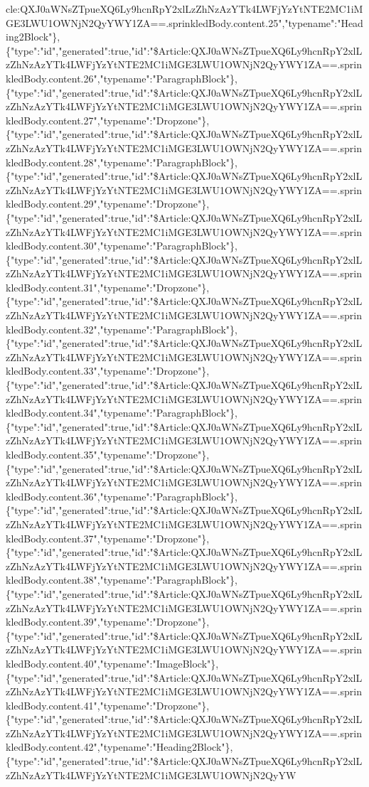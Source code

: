 cle:QXJ0aWNsZTpueXQ6Ly9hcnRpY2xlLzZhNzAzYTk4LWFjYzYtNTE2MC1iMGE3LWU1OWNjN2QyYWY1ZA==.sprinkledBody.content.25","typename":"Heading2Block"\},\{"type":"id","generated":true,"id":"\$Article:QXJ0aWNsZTpueXQ6Ly9hcnRpY2xlLzZhNzAzYTk4LWFjYzYtNTE2MC1iMGE3LWU1OWNjN2QyYWY1ZA==.sprinkledBody.content.26","typename":"ParagraphBlock"\},\{"type":"id","generated":true,"id":"\$Article:QXJ0aWNsZTpueXQ6Ly9hcnRpY2xlLzZhNzAzYTk4LWFjYzYtNTE2MC1iMGE3LWU1OWNjN2QyYWY1ZA==.sprinkledBody.content.27","typename":"Dropzone"\},\{"type":"id","generated":true,"id":"\$Article:QXJ0aWNsZTpueXQ6Ly9hcnRpY2xlLzZhNzAzYTk4LWFjYzYtNTE2MC1iMGE3LWU1OWNjN2QyYWY1ZA==.sprinkledBody.content.28","typename":"ParagraphBlock"\},\{"type":"id","generated":true,"id":"\$Article:QXJ0aWNsZTpueXQ6Ly9hcnRpY2xlLzZhNzAzYTk4LWFjYzYtNTE2MC1iMGE3LWU1OWNjN2QyYWY1ZA==.sprinkledBody.content.29","typename":"Dropzone"\},\{"type":"id","generated":true,"id":"\$Article:QXJ0aWNsZTpueXQ6Ly9hcnRpY2xlLzZhNzAzYTk4LWFjYzYtNTE2MC1iMGE3LWU1OWNjN2QyYWY1ZA==.sprinkledBody.content.30","typename":"ParagraphBlock"\},\{"type":"id","generated":true,"id":"\$Article:QXJ0aWNsZTpueXQ6Ly9hcnRpY2xlLzZhNzAzYTk4LWFjYzYtNTE2MC1iMGE3LWU1OWNjN2QyYWY1ZA==.sprinkledBody.content.31","typename":"Dropzone"\},\{"type":"id","generated":true,"id":"\$Article:QXJ0aWNsZTpueXQ6Ly9hcnRpY2xlLzZhNzAzYTk4LWFjYzYtNTE2MC1iMGE3LWU1OWNjN2QyYWY1ZA==.sprinkledBody.content.32","typename":"ParagraphBlock"\},\{"type":"id","generated":true,"id":"\$Article:QXJ0aWNsZTpueXQ6Ly9hcnRpY2xlLzZhNzAzYTk4LWFjYzYtNTE2MC1iMGE3LWU1OWNjN2QyYWY1ZA==.sprinkledBody.content.33","typename":"Dropzone"\},\{"type":"id","generated":true,"id":"\$Article:QXJ0aWNsZTpueXQ6Ly9hcnRpY2xlLzZhNzAzYTk4LWFjYzYtNTE2MC1iMGE3LWU1OWNjN2QyYWY1ZA==.sprinkledBody.content.34","typename":"ParagraphBlock"\},\{"type":"id","generated":true,"id":"\$Article:QXJ0aWNsZTpueXQ6Ly9hcnRpY2xlLzZhNzAzYTk4LWFjYzYtNTE2MC1iMGE3LWU1OWNjN2QyYWY1ZA==.sprinkledBody.content.35","typename":"Dropzone"\},\{"type":"id","generated":true,"id":"\$Article:QXJ0aWNsZTpueXQ6Ly9hcnRpY2xlLzZhNzAzYTk4LWFjYzYtNTE2MC1iMGE3LWU1OWNjN2QyYWY1ZA==.sprinkledBody.content.36","typename":"ParagraphBlock"\},\{"type":"id","generated":true,"id":"\$Article:QXJ0aWNsZTpueXQ6Ly9hcnRpY2xlLzZhNzAzYTk4LWFjYzYtNTE2MC1iMGE3LWU1OWNjN2QyYWY1ZA==.sprinkledBody.content.37","typename":"Dropzone"\},\{"type":"id","generated":true,"id":"\$Article:QXJ0aWNsZTpueXQ6Ly9hcnRpY2xlLzZhNzAzYTk4LWFjYzYtNTE2MC1iMGE3LWU1OWNjN2QyYWY1ZA==.sprinkledBody.content.38","typename":"ParagraphBlock"\},\{"type":"id","generated":true,"id":"\$Article:QXJ0aWNsZTpueXQ6Ly9hcnRpY2xlLzZhNzAzYTk4LWFjYzYtNTE2MC1iMGE3LWU1OWNjN2QyYWY1ZA==.sprinkledBody.content.39","typename":"Dropzone"\},\{"type":"id","generated":true,"id":"\$Article:QXJ0aWNsZTpueXQ6Ly9hcnRpY2xlLzZhNzAzYTk4LWFjYzYtNTE2MC1iMGE3LWU1OWNjN2QyYWY1ZA==.sprinkledBody.content.40","typename":"ImageBlock"\},\{"type":"id","generated":true,"id":"\$Article:QXJ0aWNsZTpueXQ6Ly9hcnRpY2xlLzZhNzAzYTk4LWFjYzYtNTE2MC1iMGE3LWU1OWNjN2QyYWY1ZA==.sprinkledBody.content.41","typename":"Dropzone"\},\{"type":"id","generated":true,"id":"\$Article:QXJ0aWNsZTpueXQ6Ly9hcnRpY2xlLzZhNzAzYTk4LWFjYzYtNTE2MC1iMGE3LWU1OWNjN2QyYWY1ZA==.sprinkledBody.content.42","typename":"Heading2Block"\},\{"type":"id","generated":true,"id":"\$Article:QXJ0aWNsZTpueXQ6Ly9hcnRpY2xlLzZhNzAzYTk4LWFjYzYtNTE2MC1iMGE3LWU1OWNjN2QyYW